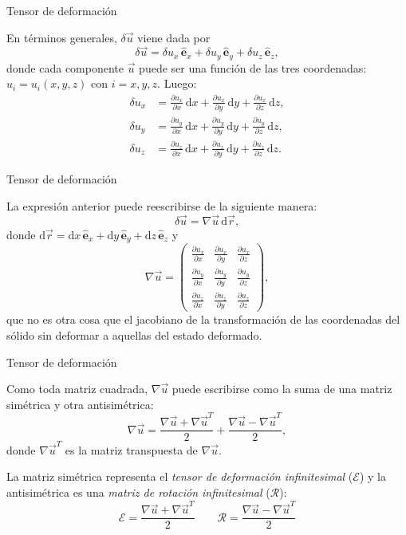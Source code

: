 \documentclass[11pt,handout,aspectratio=1610]{beamer}
\newcommand{\diff}[0]{\text{d}}
\newcommand{\pdiff}[2]{\frac{\partial #1}{\partial #2}}
\newcommand{\ver}[1]{\hat{\mathbf{#1}}}
\newcommand{\vs}{\vspace{11pt}}
\begin{document}
\begin{frame}{Tensor de deformación}

    En términos generales, $\delta \vec{u}$ viene dada por $$ \delta \vec{u} = \delta u_x \, \ver{e}_x + \delta u_y \, \ver{e}_y + \delta u_z \, \ver{e}_z, $$ donde cada componente $\vec{u}$ puede ser una función de las tres coordenadas: $u_i = u_i (x,y,z)$ con $i = x,y,z$. Luego:
    \begin{align*}
        \delta u_x &= \pdiff{u_x}{x} \, \diff{x} + \pdiff{u_x}{y} \, \diff y + \pdiff{u_x}{z} \, \diff z, \\
        \delta u_y &= \pdiff{u_y}{x} \, \diff{x} + \pdiff{u_y}{y} \, \diff y + \pdiff{u_y}{z} \, \diff z, \\
        \delta u_z &= \pdiff{u_z}{x} \, \diff{x} + \pdiff{u_z}{y} \, \diff y + \pdiff{u_z}{z} \, \diff z.
    \end{align*}

\end{frame}

\begin{frame}{Tensor de deformación}

    La expresión anterior puede reescribirse de la siguiente manera: $$ \delta \vec{u} = \nabla \vec{u} \, \diff \vec{r},$$ donde $\diff \vec{r} = \diff x \, \ver{e}_x  + \diff y \, \ver{e}_y + \diff z \, \ver{e}_z$ y 
    $$ \nabla \vec{u} = \begin{pmatrix}
        \pdiff{u_x}{x} & \pdiff{u_x}{y} & \pdiff{u_x}{z} \\
        \pdiff{u_y}{x} & \pdiff{u_y}{y} & \pdiff{u_y}{z} \\
        \pdiff{u_z}{x} & \pdiff{u_z}{y} & \pdiff{u_z}{z}
    \end{pmatrix}, $$ que no es otra cosa que el jacobiano de la transformación de las coordenadas del sólido sin deformar a aquellas del estado deformado.

\end{frame}

\begin{frame}{Tensor de deformación}

    Como toda matriz cuadrada, $\nabla \vec{u}$ puede escribirse como la suma de una matriz simétrica y otra antisimétrica: $$ \nabla \vec{u} = \frac{\nabla \vec{u} + \nabla \vec{u}^{T}}{2} + \frac{\nabla \vec{u} - \nabla \vec{u}^{T}}{2}, $$ donde $\nabla \vec{u}^{T}$ es la matriz transpuesta de $\nabla \vec{u}$.

    \vs 

    La matriz simétrica representa el \emph{tensor de deformación infinitesimal} ($\mathcal{E}$) y la antisimétrica es una \emph{matriz de rotación infinitesimal} ($\mathcal{R}$): $$ \mathcal{E} = \frac{\nabla \vec{u} + \nabla \vec{u}^{T}}{2} \qquad \mathcal{R} = \frac{\nabla \vec{u} - \nabla \vec{u}^{T}}{2} $$

\end{frame}
\end{document}
